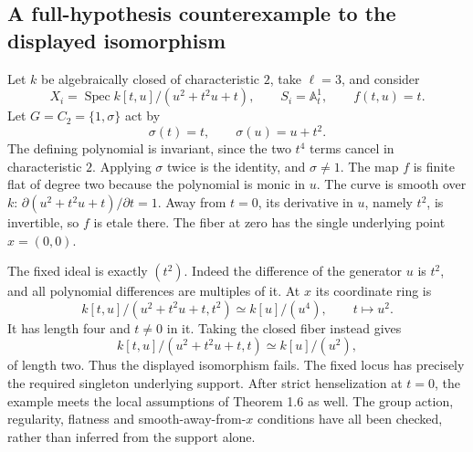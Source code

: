 \documentclass[10pt]{article}
\begin{document}
\subsection*{A full-hypothesis counterexample to the displayed isomorphism}
Let \(k\) be algebraically closed of characteristic \(2\), take \(\ell=3\), and consider \[X_i=\operatorname{Spec}k[t,u]/(u^2+t^2u+t),\qquad
 S_i=\mathbb A^1_t,\qquad f(t,u)=t.\] Let \(G=C_2=\{1,\sigma\}\) act by \[\sigma(t)=t,\qquad \sigma(u)=u+t^2.\] The defining polynomial is invariant, since the two \(t^4\) terms cancel in characteristic \(2\). Applying \(\sigma\) twice is the identity, and \(\sigma\ne1\). The map \(f\) is finite flat of degree two because the polynomial is monic in \(u\). The curve is smooth over \(k\): \(\partial(u^2+t^2u+t)/\partial t=1\). Away from \(t=0\), its derivative in \(u\), namely \(t^2\), is invertible, so \(f\) is etale there. The fiber at zero has the single underlying point \(x=(0,0)\).\par
The fixed ideal is exactly \((t^2)\). Indeed the difference of the generator \(u\) is \(t^2\), and all polynomial differences are multiples of it. At \(x\) its coordinate ring is \[k[t,u]/(u^2+t^2u+t,t^2)
       \simeq k[u]/(u^4),\qquad t\longmapsto u^2.\] It has length four and \(t\ne0\) in it. Taking the closed fiber instead gives \[k[t,u]/(u^2+t^2u+t,t)
       \simeq k[u]/(u^2),\] of length two. Thus the displayed isomorphism fails. The fixed locus has precisely the required singleton underlying support. After strict henselization at \(t=0\), the example meets the local assumptions of Theorem 1.6 as well. The group action, regularity, flatness and smooth-away-from-\(x\) conditions have all been checked, rather than inferred from the support alone.\par
\end{document}
